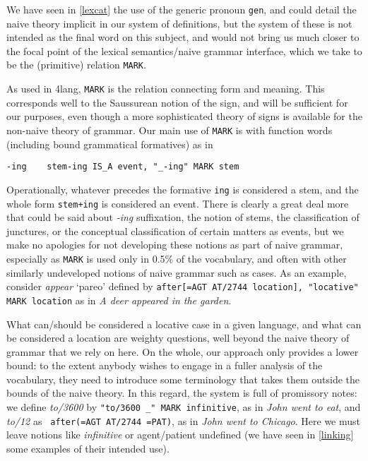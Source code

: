 \documentclass[11pt,bookmarks,bookmarksnumbered,naturalnames,plainpages=false,pdftex,colorlinks=true,urlcolor=blue,bookmarksdepth=subsection,plainpages=false]{paper}
\begin{document}
We have seen in \ref{lexcat} the use of the generic pronoun {\tt gen}, and
could detail the naive theory implicit in our system of definitions, but the
system of these is not intended as the final word on this subject, and would
not bring us much closer to the focal point of the lexical semantics/naive
grammar interface, which we take to be the (primitive) relation {\tt MARK}.

As used in 4lang, {\tt MARK} is the relation connecting form and meaning. This
corresponds well to the Saussurean notion of the sign, and will be sufficient
for our purposes, even though a more sophisticated theory of signs
\citep{Kracht:2011} is available for the non-naive theory of grammar. Our main
use of {\tt MARK} is with function words (including bound grammatical formatives) as
in

\begin{verbatim}
-ing    stem-ing IS_A event, "_-ing" MARK stem
\end{verbatim}

Operationally, whatever precedes the formative {\tt ing} is considered a stem,
and the whole form {\tt stem+ing} is considered an event. There is clearly a
great deal more that could be said about {\it -ing} suffixation, the notion of
stems, the classification of junctures, or the conceptual classification of
certain matters as events, but we make no apologies for not developing these
notions as part of naive grammar, especially as {\tt MARK} is used only in
0.5\% of the vocabulary, and often with other similarly undeveloped notions of
naive grammar such as cases. As an example, consider {\it appear} `pareo'
defined by {\tt after[=AGT AT/2744 location], "locative" MARK location} as in
{\it A deer appeared in the garden}.

What can/should be considered a locative case in a given language, and what
can be considered a location are weighty questions, well beyond the naive
theory of grammar that we rely on here. On the whole, our approach only
provides a lower bound: to the extent anybody wishes to engage in a fuller
analysis of the vocabulary, they need to introduce some terminology that takes
them outside the bounds of the naive theory. In this regard, the system is
full of promissory notes: we define {\it to/3600} by {\tt "to/3600 \_" MARK
  infinitive}, as in {\it John went to eat}, and {\it to/12} as {\tt
  after(=AGT AT/2744 =PAT)}, as in {\it John went to Chicago}. Here we must
leave notions like {\it infinitive} or agent/patient undefined (we have seen
in \ref{linking} some examples of their intended use).
\end{document}
